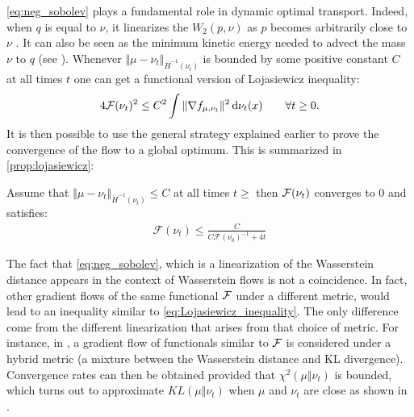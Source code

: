 \cref{eq:neg_sobolev} plays a fundamental role in dynamic optimal transport. Indeed, when $q$ is equal to $\nu$, it linearizes the $W_2(p,\nu)$ as $p$ becomes arbitrarily close to $\nu$ \cite{Villani:2009,Otto:2000,Peyre:2011}. It can also be seen as the minimum kinetic energy needed to advect the mass $\nu$ to $q$ (see \cite{mroueh2018regularized}).
Whenever $\Vert \mu - \nu_t \Vert_{\dot{H}^{-1}(\nu_t)} $ is bounded by some positive constant $C$ at all times $t$ one can get a functional version of Lojasiewicz inequality:
\begin{align}\label{eq:Lojasiewicz_inequality}
	4{{\mathcal F}}(\nu_t)^2\leq C^2 \int \Vert \nabla f_{\mu,\nu_t} \Vert^2 \mathop{}\!\mathrm{d} \nu_t(x)  \qquad \forall t\geq 0.
\end{align} 
It is then possible to use the general strategy explained earlier to prove the convergence of the flow to a global optimum. This is summarized in \cref{prop:lojasiewicz}:
\begin{proposition}\label{prop:lojasiewicz}
	Assume that $\Vert \mu - \nu_t \Vert_{\dot{H}^{-1}(\nu_t)} \leq C$ at all times $t\geq$ then ${{\mathcal F}}(\nu_t)$ converges to $0$ and satisfies:
	\begin{align}
	\mathcal{F}(\nu_t)\leq \frac{C}{C\mathcal{F}(\nu_0)^{-1} + 4t}
	\end{align}
\end{proposition}
The fact that \cref{eq:neg_sobolev}, which is a linearization of the Wasserstein distance appears in the context of Wasserstein flows is not a coincidence. In fact, other gradient flows of the same functional ${{\mathcal F}}$ under a different metric, would lead to an inequality similar to \cref{eq:Lojasiewicz_inequality}. The only difference come from the different linearization that arises from that choice of metric. For instance, in \cite{Rotskoff:2019}, a gradient flow of functionals similar to ${{\mathcal F}}$ is considered under a hybrid metric (a mixture between the Wasserstein distance and KL divergence). Convergence rates can then be obtained provided that $\chi^2(\mu\Vert \nu_t)$ is bounded, which turns out to approximate $KL(\mu\Vert \nu_t)$ when $\mu$ and $\nu_t$ are close as shown in .


